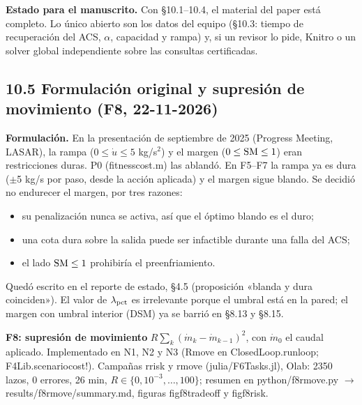 \documentclass[11pt,a4paper]{article}
\newcommand{\codeus}{\textunderscore\allowbreak}
\newcommand{\code}[1]{{\small\ttfamily\let\_\codeus #1}}
\begin{document}
\textbf{Estado para el manuscrito.} Con \S{}10.1–10.4, el material del paper está completo. Lo único abierto son los datos del equipo (\S{}10.3: tiempo de recuperación del ACS, $\alpha$, capacidad y rampa) y, si un revisor lo pide, Knitro o un solver global independiente sobre las consultas certificadas.

\subsection*{10.5 Formulación original y supresión de movimiento (F8, 22-11-2026)}
\textbf{Formulación.} En la presentación de septiembre de 2025 (Progress Meeting, LASAR), la rampa ($0\le\dot u\le5$ kg/s$^{2}$) y el margen ($0\le{\rm SM}\le1$) eran restricciones duras. P0 (\code{fitness\_cost.m}) las ablandó. En F5–F7 la rampa ya es dura ($\pm$5 kg/s por paso, desde la acción aplicada) y el margen sigue blando. Se decidió no endurecer el margen, por tres razones:

\begin{itemize}
\item su penalización nunca se activa, así que el óptimo blando es el duro;
\item una cota dura sobre la salida puede ser infactible durante una falla del ACS;
\item el lado ${\rm SM}\le1$ prohibiría el preenfriamiento.
\end{itemize}

Quedó escrito en el reporte de estado, \S{}4.5 (proposición «blanda y dura coinciden»). El valor de $\lambda_{\rm pct}$ es irrelevante porque el umbral está en la pared; el margen con umbral interior (DSM) ya se barrió en \S{}8.13 y \S{}8.15.

\textbf{F8: supresión de movimiento} $R\sum_k(\dot m_k-\dot m_{k-1})^2$, con $\dot m_0$ el caudal aplicado. Implementado en N1, N2 y N3 (\code{Rmove} en \code{ClosedLoop.run\_loop}; \code{F4Lib.scenario\_cost!}). Campañas \code{rrisk} y \code{rmove} (\code{julia/F6Tasks.jl}), Olab: 2350 lazos, 0 errores, 26 min, $R\in\{0,10^{-3},\dots,100\}$; resumen en \code{python/f8\_rmove.py} $\to$ \code{results/f8\_rmove/summary.md}, figuras \code{fig\_f8\_tradeoff} y \code{fig\_f8\_risk}.
\end{document}
